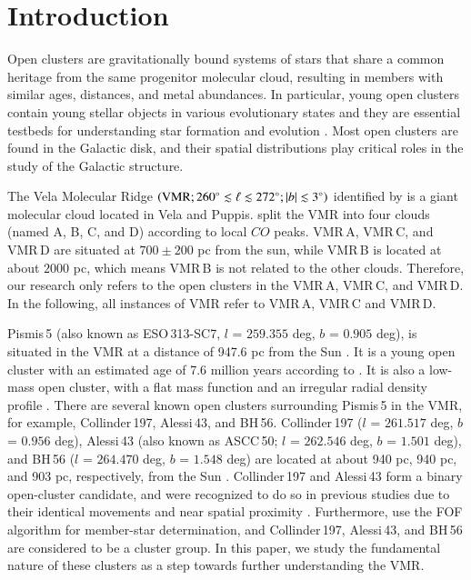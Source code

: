 \documentclass{aa} %
\begin{document}
   \maketitle
%

\section{Introduction}\label{sec:intro}
Open clusters are gravitationally bound systems of stars that share a common 
heritage from the same progenitor molecular cloud, resulting in members with similar ages, distances, and metal abundances.
In particular, young open clusters contain young stellar objects in various 
evolutionary states and they are essential testbeds for understanding star formation and evolution \citep{2003ARA&A..41...57L}. 
Most open clusters are found in the Galactic disk, and their 
spatial distributions play critical roles in the study of the Galactic structure. 

The Vela Molecular Ridge $\left( {\rm VMR}; 260^{\circ} \lesssim \ell \lesssim 272^{\circ} ;|b| \lesssim 3^{\circ}\right)$ 
identified by \citet{1991A&A...247..202M} is a giant molecular cloud located in Vela and Puppis. 
\citet{1991A&A...247..202M} split the VMR into four clouds (named A, B, C, and D) according to 
local $CO$ peaks. VMR\,A, VMR\,C, and VMR\,D are situated at $700\pm200$ pc from the sun, 
while VMR\,B is located at about $2000$ pc, which means VMR\,B is not related to the other clouds. 
Therefore, our research only refers to the open clusters in the VMR\,A, VMR\,C, and VMR\,D. In the 
following, all instances of VMR refer to VMR\,A, VMR\,C and VMR\,D.



Pismis\,5 (also known as ESO\,313-SC7, $l$ = $259.355$ deg, $b$ = $0.905$ deg),
is situated in the VMR at a distance of 947.6 pc from the Sun \citep{2020A&A...633A..99C}. It is a young open cluster with an estimated age of 7.6 million years according to \citet{2021MNRAS.504..356D}. It is also a low-mass open cluster, with a flat mass function and an irregular radial density profile \citep{2009MNRAS.397.1915B}.
There are several known open clusters surrounding Pismis\,5 in the VMR,
for example, Collinder\,197, Alessi\,43, and BH\,56. 
Collinder\,197 ($l$ = $261.517$ deg, $b$ = $0.956$ deg), Alessi\,43 (also known as ASCC\,50;
$l$ = $262.546$ deg, $b$ = $1.501$ deg), and BH\,56 ($l$ = $264.470$ deg, $b$ = $1.548$ deg) are located 
at about 940 pc, 940 pc, and 903 pc, respectively, from the Sun \citep{2020A&A...633A..99C}.
Collinder\,197 and Alessi\,43 form a binary open-cluster candidate, and were recognized to do so in previous 
studies due to their identical movements and near spatial proximity \citep{2009A&A...500L..13D,2021A&A...649A..54P}.
Furthermore, \citet{2019ApJS..245...32L} use the FOF algorithm for member-star determination, and Collinder\,197, Alessi\,43, and BH\,56 are considered to be a cluster group. In this paper, we study the fundamental nature of these clusters as a step towards further understanding the VMR.
\end{document}
